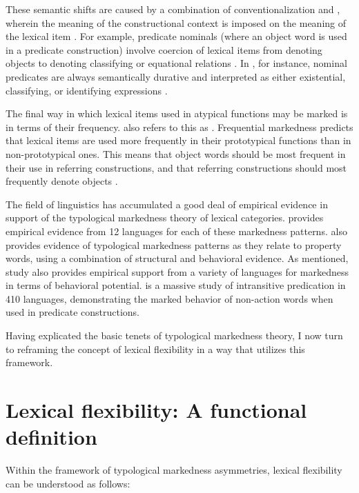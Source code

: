 These semantic shifts are caused by a combination of conventionalization and , wherein the meaning of the constructional context is imposed on the meaning of the lexical item \parencites{Pustejovsky1991}[69, 108]{Croft1991}[252]{PantherThornburg2007}{AudringBooij2016}. For example, predicate nominals (where an object word is used in a predicate construction) involve coercion of lexical items from denoting objects to denoting classifying or equational relations \parencite[69]{Croft1991}. In , for instance, nominal predicates are always semantically durative and interpreted as either existential, classifying, or identifying expressions \parencite[47]{Nakayama2001}.

The final way in which lexical items used in atypical functions may be marked is in terms of their frequency. \textcite[59, 87]{Croft1991} also refers to this as . Frequential markedness predicts that lexical items are used more frequently in their prototypical functions than in non-prototypical ones. This means that object words should be most frequent in their use in referring constructions, and that referring constructions should most frequently denote objects \parencite[87]{Croft1991}.

The field of linguistics has accumulated a good deal of empirical evidence in support of the typological markedness theory of lexical categories. \textcite{Croft1991} provides empirical evidence from 12 languages for each of these markedness patterns. \textcite{Dixon1977} also provides evidence of typological markedness patterns as they relate to property words, using a combination of structural and behavioral evidence. As mentioned,  study also provides empirical support from a variety of languages for markedness in terms of behavioral potential. \textcite{Stassen1997} is a massive study of intransitive predication in 410 languages, demonstrating the marked behavior of non-action words when used in predicate constructions.

Having explicated the basic tenets of typological markedness theory, I now turn to reframing the concept of lexical flexibility in a way that utilizes this framework.

\section{Lexical flexibility: A functional definition}
\label{sec:2.5}

Within the framework of typological markedness asymmetries, lexical flexibility can be understood as follows:

